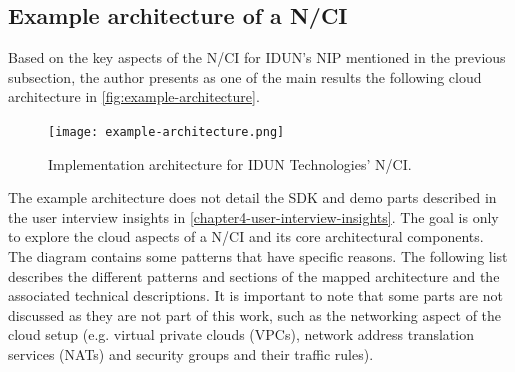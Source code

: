 \subsection{Example architecture of a N/CI}
\label{chapter5-example-architecture-of-a-nci}

Based on the key aspects of the N/CI for IDUN's NIP mentioned in the previous subsection, the author presents as one of the main results the following cloud architecture in \autoref{fig:example-architecture}.

\begin{figure}[!ht]
  \centering
  \texttt{[image: example-architecture.png]}
  \caption{Implementation architecture for IDUN Technologies' N/CI.}
  \label{fig:example-architecture}
\end{figure}

\newpage

The example architecture does not detail the SDK and demo parts described in the user interview insights in \autoref{chapter4-user-interview-insights}. The goal is only to explore the cloud aspects of a N/CI and its core architectural components. The diagram contains some patterns that have specific reasons. The following list describes the different patterns and sections of the mapped architecture and the associated technical descriptions. It is important to note that some parts are not discussed as they are not part of this work, such as the networking aspect of the cloud setup (e.g. virtual private clouds (VPCs), network address translation services (NATs) and security groups and their traffic rules).

